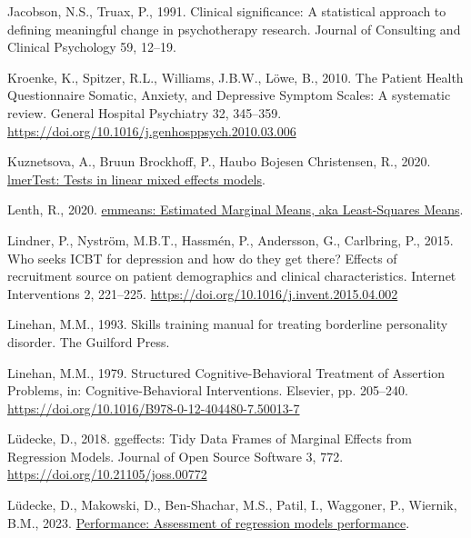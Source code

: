 \documentclass[3p]{elsarticle} %
\newlength{\cslhangindent}
\newlength{\cslentryspacingunit} %
\newenvironment{CSLReferences}[2] %
 {%
  \setlength{\parindent}{0pt}
  \ifodd #1
  \let\oldpar\par
  \def\par{\hangindent=\cslhangindent\oldpar}
  \fi
  \setlength{\parskip}{#2\cslentryspacingunit}
 }%
 {}
\begin{document}
\begin{CSLReferences}{1}{0}
\leavevmode{}%
Jacobson, N.S., Truax, P., 1991. {Clinical significance: A statistical
approach to defining meaningful change in psychotherapy research}.
Journal of Consulting and Clinical Psychology 59, 12--19.

\leavevmode{}%
Kroenke, K., Spitzer, R.L., Williams, J.B.W., Löwe, B., 2010. {The
Patient Health Questionnaire Somatic, Anxiety, and Depressive Symptom
Scales: A systematic review}. General Hospital Psychiatry 32, 345--359.
\url{https://doi.org/10.1016/j.genhosppsych.2010.03.006}

\leavevmode{}%
Kuznetsova, A., Bruun Brockhoff, P., Haubo Bojesen Christensen, R.,
2020. \href{https://github.com/runehaubo/lmerTestR}{lmerTest: Tests in
linear mixed effects models}.

\leavevmode{}%
Lenth, R., 2020.
\href{https://cran.r-project.org/package=emmeans}{{emmeans: Estimated
Marginal Means, aka Least-Squares Means}}.

\leavevmode{}%
Lindner, P., Nyström, M.B.T., Hassmén, P., Andersson, G., Carlbring, P.,
2015. Who seeks ICBT for depression and how do they get there? Effects
of recruitment source on patient demographics and clinical
characteristics. Internet Interventions 2, 221--225.
\url{https://doi.org/10.1016/j.invent.2015.04.002}

\leavevmode{}%
Linehan, M.M., 1993. Skills training manual for treating borderline
personality disorder. The Guilford Press.

\leavevmode{}%
Linehan, M.M., 1979. {Structured Cognitive-Behavioral Treatment of
Assertion Problems}, in: Cognitive-Behavioral Interventions. Elsevier,
pp. 205--240. \url{https://doi.org/10.1016/B978-0-12-404480-7.50013-7}

\leavevmode{}%
Lüdecke, D., 2018. {ggeffects: Tidy Data Frames of Marginal Effects from
Regression Models}. Journal of Open Source Software 3, 772.
\url{https://doi.org/10.21105/joss.00772}

\leavevmode{}%
Lüdecke, D., Makowski, D., Ben-Shachar, M.S., Patil, I., Waggoner, P.,
Wiernik, B.M., 2023.
\href{https://easystats.github.io/performance/}{Performance: Assessment
of regression models performance}.


\end{CSLReferences}
\end{document}
